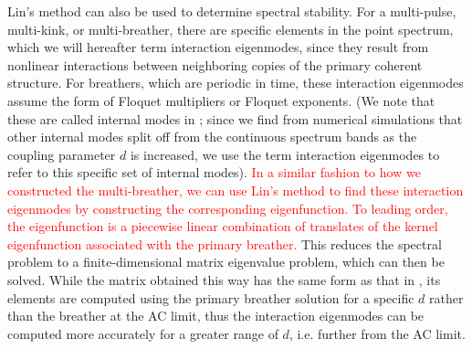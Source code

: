 \documentclass[12pt,reqno]{amsart}
\theoremstyle{definition}
\newcommand{\revised}[1]{ \textcolor{red}{#1} }
\begin{document}
Lin's method can also be used to determine spectral stability. For a multi-pulse, multi-kink, or multi-breather, there are specific elements in the point spectrum, which we will hereafter term interaction eigenmodes, since they result from nonlinear interactions between neighboring copies of the primary coherent structure. For breathers, which are periodic in time, these interaction eigenmodes assume the form of Floquet multipliers or Floquet exponents.
(We note that these are called internal modes in \cite{cuevas-maraver2016}; since we find from numerical simulations that other internal modes split off from the continuous spectrum bands as the coupling parameter $d$ is increased, we use the term interaction eigenmodes to refer to this specific set of internal modes).
\revised{
In a similar fashion to how we constructed the multi-breather,
we can use Lin's method to find these interaction eigenmodes by constructing the corresponding eigenfunction. To leading order, the eigenfunction is a piecewise linear combination of translates of the kernel eigenfunction associated with the primary breather.
}
This reduces the spectral problem to a finite-dimensional matrix eigenvalue problem, which can then be solved. While the matrix obtained this way has the same form as that in \cites{Pelinovsky2012,cuevas-maraver2016}, its elements are computed using the primary breather solution for a specific $d$ rather than the breather at the AC limit, thus the interaction eigenmodes can be computed more accurately for a greater range of $d$, i.e. further from the AC limit.
\end{document}
